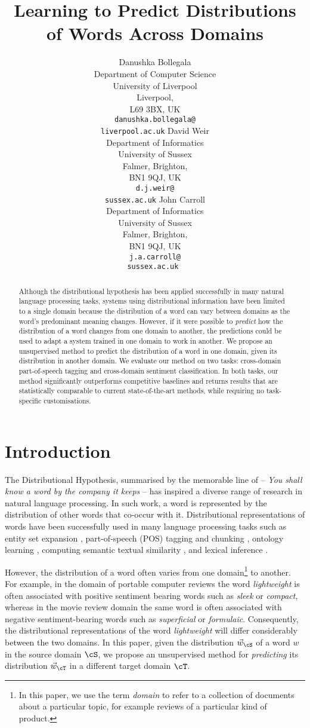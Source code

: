 \documentclass[11pt]{article}
\title{Learning to Predict Distributions of Words Across Domains}
\author{
		Danushka Bollegala \\
		Department of Computer Science\\
		University of Liverpool\\
		Liverpool,\\
		L69 3BX, UK\\
		{\normalsize \tt danushka.bollegala@} \\ {\normalsize \tt liverpool.ac.uk}	
	\And David Weir\\
		Department of Informatics \\
		University of Sussex \\
		Falmer, Brighton,\\
		 BN1 9QJ, UK \\
		{\normalsize \tt d.j.weir@} \\ {\normalsize \tt sussex.ac.uk}	
	\And John Carroll \\
		Department of Informatics \\
		University of Sussex \\
		Falmer, Brighton,\\
		BN1 9QJ, UK \\
		{\normalsize \tt j.a.carroll@} \\ {\normalsize \tt sussex.ac.uk }
		}
\date{}
\begin{document}
\maketitle

\begin{abstract}

Although the distributional hypothesis has been applied successfully in many natural language processing tasks,
systems using distributional information have been limited to a single domain because
the distribution of a word can vary between domains as the word's predominant meaning changes.
However, if it were possible to \textit{predict} how the distribution
of a word changes from one domain to another, the predictions could be used to
adapt a system trained in one domain to work in another.
We propose an unsupervised method to predict the distribution of
a word in one domain, given its distribution in another domain.
We evaluate our method on two tasks: cross-domain part-of-speech tagging
and cross-domain sentiment classification. In both tasks, our method significantly outperforms 
competitive baselines and returns results that are statistically comparable to current state-of-the-art methods,
while requiring no task-specific customisations.
\end{abstract}

\section{Introduction}

The Distributional Hypothesis, summarised by the memorable line of
 -- \emph{You shall know a word by the company it keeps} --
has inspired a diverse range of research in natural language processing.
In such work, a word is represented by the distribution of other words that co-occur with it. 
Distributional representations of words have been successfully used in
many language processing tasks such as
entity set expansion \cite{Pantel:2009},
part-of-speech (POS) tagging and chunking \cite{Huang:ACL:2009},
ontology learning \cite{Curran:2005},
computing semantic textual similarity \cite{Besancon:1999},
and lexical inference \cite{Kotlerman:2010}.

However, the distribution of a word often varies
from one domain\footnote{In this paper, we use the term \textit{domain} to refer to a collection of 
documents about a particular topic, for example reviews of a particular kind of product.} to another. 
For example, in the domain of portable computer reviews the word \textit{lightweight} is often associated
with positive sentiment bearing words such as \textit{sleek} or \textit{compact}, 
whereas in the movie review domain the same word is often associated with negative sentiment-bearing words such as 
\textit{superficial} or \textit{formulaic}.
Consequently, the distributional representations of the word \textit{lightweight} will differ considerably between the
two domains. In this paper, given the distribution $\vec{w}_{\cS}$ of a word $w$ in the source domain $\cS$,
we propose an unsupervised method for \textit{predicting} its distribution $\vec{w}_{\cT}$
in a different target domain $\cT$. 
\end{document}
